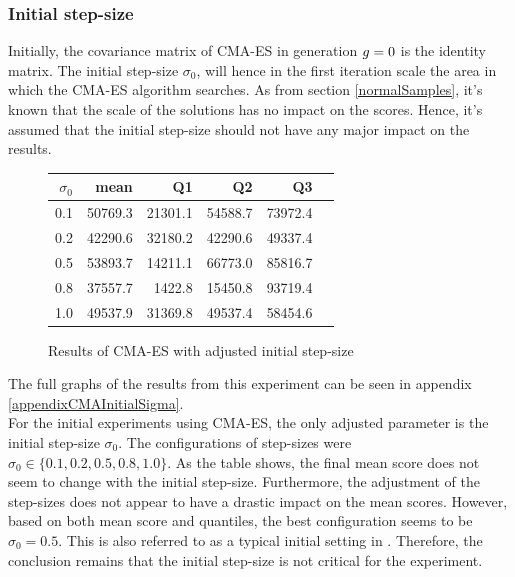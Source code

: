 \subsubsection{Initial step-size \label{sec:CMAInitialStepSize}}
Initially, the covariance matrix of CMA-ES in generation $g = 0$
is the identity matrix. The initial step-size $\sigma_0$, will hence in 
the first iteration scale the area in which the CMA-ES algorithm searches.
As from section \ref{normalSamples}, it's known that the scale of the 
solutions has no impact on the scores. Hence, it's assumed that the initial 
step-size should not have any major impact on the results.

\begin{figure}[H]
\centering
\begin{tabular}{r | r r r r r}
$\sigma_0$ & mean & Q1 & Q2 & Q3\\
\hline
0.1 & 50769.3 & 21301.1 & 54588.7 & 73972.4\\
0.2 & 42290.6 & 32180.2 & 42290.6 & 49337.4\\
0.5 & 53893.7 & 14211.1 & 66773.0 & 85816.7\\
0.8 & 37557.7 & 1422.8  & 15450.8 & 93719.4\\
1.0 & 49537.9 & 31369.8 & 49537.4 & 58454.6
\end{tabular}
\caption{Results of CMA-ES with adjusted initial step-size \label{CMAInitialSigmaConfigTest}}
\end{figure}
The full graphs of the results from this experiment can be seen in 
appendix \ref{appendixCMAInitialSigma}.\\
For the initial experiments using CMA-ES, 
the only adjusted parameter is the initial 
step-size $\sigma_0$. The configurations of step-sizes were 
$\sigma_0 \in \{0.1, 0.2, 0.5, 0.8, 1.0\}$. As the table shows,
the final mean score does not seem to change with the initial step-size.
Furthermore, the adjustment of the step-sizes does not appear to 
have a drastic impact on the mean scores. However, based on both mean score and
quantiles, the best configuration seems to be $\sigma_0 = 0.5$. This 
is also referred to as a typical initial setting in \citep{boumaza2009}.
Therefore, the conclusion remains that the initial step-size is not critical 
for the experiment.\\

